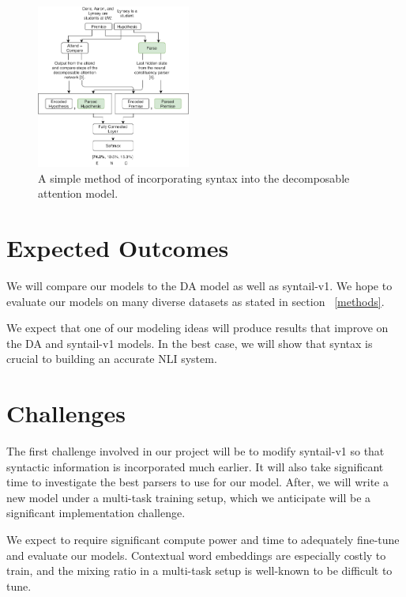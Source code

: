 \documentclass[11pt,a4paper]{article}
\begin{document}
\begin{figure}[h]
  \includegraphics[width=0.45\textwidth]{v1}
  \caption{A simple method of incorporating syntax into the decomposable
    attention model.}
\label{figure:v1}
\end{figure}

\section{Expected Outcomes}

We will compare our models to the DA model as well as syntail-v1. We hope to
evaluate our models on many diverse datasets as stated in section
~\ref{methods}.

We expect that one of our modeling ideas will produce results that improve on
the DA and syntail-v1 models. In the best case, we will show that syntax is
crucial to building an accurate NLI system.

\section{Challenges}

The first challenge involved in our project will be to modify syntail-v1
so that syntactic information is incorporated much earlier. It will also take
significant time to investigate the best parsers to use for our model.
After, we will write a new model under a multi-task training setup, which we
anticipate will be a significant implementation challenge.

We expect to require significant compute power and time to adequately fine-tune
and evaluate our models. Contextual word embeddings are especially costly to
train, and the mixing ratio in a multi-task setup is well-known to be
difficult to tune.



\end{document}

